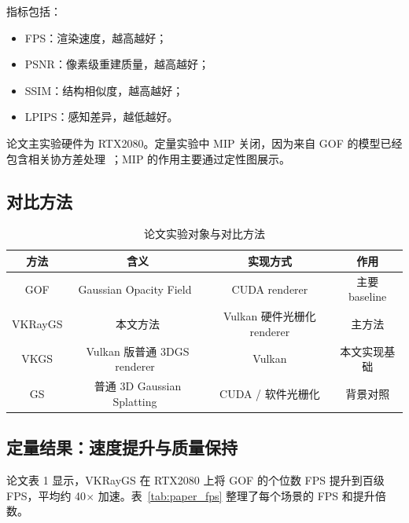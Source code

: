 \documentclass[12pt,hyperref,a4paper,UTF8]{ctexart}
\begin{document}
指标包括：

\begin{itemize}
    \item FPS：渲染速度，越高越好；
    \item PSNR：像素级重建质量，越高越好；
    \item SSIM：结构相似度，越高越好；
    \item LPIPS：感知差异，越低越好。
\end{itemize}

论文主实验硬件为 RTX2080。定量实验中 MIP 关闭，因为来自 GOF 的模型已经包含相关协方差处理~\cite{gaussianopacityfields}；MIP 的作用主要通过定性图展示。



\subsection{对比方法}

\begin{table}[H]
    \centering
    \caption{论文实验对象与对比方法}
    \setlength{\tabcolsep}{0pt}
    \renewcommand{\arraystretch}{1.2}
    \begin{tabular}{cccc}
        \bottomrule[1.5pt]
        \textbf{方法} & \textbf{含义} & \textbf{实现方式} & \textbf{作用} \\
        \midrule[0.5pt]
        GOF & Gaussian Opacity Field~\cite{gaussianopacityfields} & CUDA renderer & 主要 baseline \\
        VKRayGS & 本文方法 & Vulkan 硬件光栅化 renderer & 主方法 \\
        VKGS & Vulkan 版普通 3DGS renderer~\cite{vkgs} & Vulkan & 本文实现基础 \\
        GS & 普通 3D Gaussian Splatting~\cite{3dgaussiansplatting} & CUDA / 软件光栅化 & 背景对照 \\
        \toprule[1.5pt]
    \end{tabular}
\end{table}



\subsection{定量结果：速度提升与质量保持}
论文表 1 显示，VKRayGS 在 RTX2080 上将 GOF 的个位数 FPS 提升到百级 FPS，平均约 40$\times$ 加速。表~\ref{tab:paper_fps} 整理了每个场景的 FPS 和提升倍数。
\end{document}
